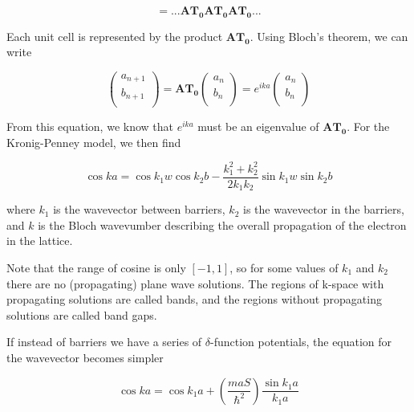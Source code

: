 \begin{equation*}
= ... \mathbf{A}\mathbf{T_{0}}\mathbf{A}\mathbf{T_{0}}\mathbf{A}\mathbf{T_{0}}...
\end{equation*}

Each unit cell is represented by the product $\mathbf{A}\mathbf{T_{0}}$. Using Bloch's theorem, we can write

\begin{equation}
	\begin{pmatrix}
		a_{n+1} \\
		b_{n+1} \\
	\end{pmatrix} =
	\mathbf{AT_{0}}
	\begin{pmatrix}
		a_{n} \\
		b_{n} \\
	\end{pmatrix} = 
	e^{i k a}
	\begin{pmatrix}
		a_{n} \\
		b_{n} \\
	\end{pmatrix}
\end{equation}

From this equation, we know that $e^{i k a}$ must be an eigenvalue of $\mathbf{AT_{0}}$. For the Kronig-Penney model, we then find

\begin{equation}
\cos{k a} = \cos{k_{1} w} \cos{k_{2} b} - \frac{k_{1}^{2} + k_{2}^{2}}{2 k_{1} k_{2}} \sin{k_{1} w} \sin{k_{2} b}
\end{equation}

where $k_{1}$ is the wavevector between barriers, $k_{2}$ is the wavevector in the barriers, and $k$ is the Bloch wavevumber describing the overall propagation of the electron in the lattice.

Note that the range of cosine is only $[-1, 1]$, so for some values of $k_{1}$ and $k_{2}$ there are no (propagating) plane wave solutions. The regions of k-space with propagating solutions are called bands, and the regions without propagating solutions are called band gaps.

If instead of barriers we have a series of $\delta$-function potentials, the equation for the wavevector becomes simpler

\begin{equation}
\cos{k a} = \cos{k_{1} a} + \left( \frac{m a S}{\hbar^{2}} \right) \frac{\sin{k_{1} a}}{k_{1} a}
\end{equation}

